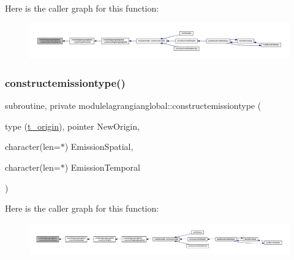 Here is the caller graph for this function\+:\nopagebreak
\begin{figure}[H]
\begin{center}
\leavevmode
\includegraphics[width=350pt]{namespacemodulelagrangianglobal_a13d67d5bfe97a6d21e41748215a9fd5c_icgraph}
\end{center}
\end{figure}
\mbox{\label{namespacemodulelagrangianglobal_a33d8b80b431bb224984d6f64b001cd6a}} 
\subsubsection{\texorpdfstring{constructemissiontype()}{constructemissiontype()}}
{\footnotesize\ttfamily subroutine, private modulelagrangianglobal\+::constructemissiontype (\begin{DoxyParamCaption}\item[{type (\mbox{\hyperlink{structmodulelagrangianglobal_1_1t__origin}{t\+\_\+origin}}), pointer}]{New\+Origin,  }\item[{character(len=$\ast$)}]{Emission\+Spatial,  }\item[{character(len=$\ast$)}]{Emission\+Temporal }\end{DoxyParamCaption})\hspace{0.3cm}{\ttfamily [private]}}

Here is the caller graph for this function\+:\nopagebreak
\begin{figure}[H]
\begin{center}
\leavevmode
\includegraphics[width=350pt]{namespacemodulelagrangianglobal_a33d8b80b431bb224984d6f64b001cd6a_icgraph}
\end{center}
\end{figure}
\mbox{\label{namespacemodulelagrangianglobal_a409542d48e7b2b20840dc3545d1a34f0}} 
